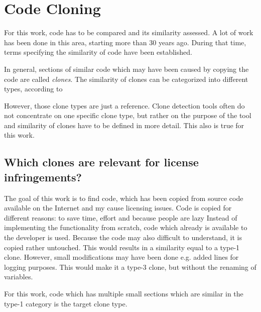 \section{Code Cloning}
For this work, code has to be compared and its similarity assessed.
A lot of work has been done in this area, starting more than 30 years ago\cite{lancaster2004comparison}.
During that time, terms specifying the similarity of code have been established.

In general, sections of similar code which may have been caused by copying the code are called \textit{clones}.
The similarity of clones can be categorized into different types, according to %

However, those clone types are just a reference.
Clone detection tools often do not concentrate on one specific clone type, but rather on the purpose of the tool and similarity of clones have to be defined in more detail.
This also is true for this work.

\subsection*{Which clones are relevant for license infringements?}
The goal of this work is to find code, which has been copied from source code available on the Internet and my cause licensing issues.
Code is copied for different reasons: to save time, effort and because people are lazy%
Instead of implementing the functionality from scratch, code which already is available to the developer is used.
Because the code may also difficult to understand, it is copied rather untouched.
This would results in a similarity equal to a type-1 clone.
However, small modifications may have been done e.g. added lines for logging purposes.
This would make it a type-3 clone, but without the renaming of variables.

For this work, code which has multiple small sections which are similar in the type-1 category is the target clone type.
